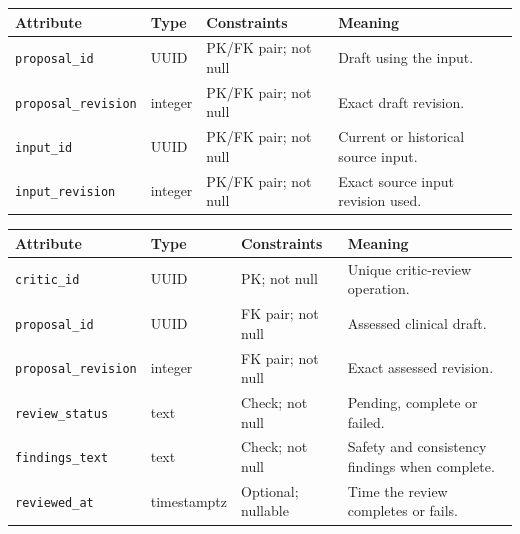 \begin{reporttable}
\setlength{\tabcolsep}{5pt}
\centering
\small
\caption{ProposalInput attributes, types and constraints.}
\label{tab:kashaf:dict-proposalinput}
\begin{tabular}{|p{}|p{}|p{}|p{}|}
\hline
Attribute & Type & Constraints & Meaning \\ \hline
\texttt{proposal\_id} & UUID & PK/FK pair; not null & Draft using the input. \\ \hline
\texttt{proposal\_revision} & integer & PK/FK pair; not null & Exact draft revision. \\ \hline
\texttt{input\_id} & UUID & PK/FK pair; not null & Current or historical source input. \\ \hline
\texttt{input\_revision} & integer & PK/FK pair; not null & Exact source input revision used. \\ \hline
\end{tabular}
\end{reporttable}

\begin{reporttable}
\setlength{\tabcolsep}{5pt}
\centering
\small
\caption{CriticReview attributes, types and constraints.}
\label{tab:kashaf:dict-criticreview}
\begin{tabular}{|p{}|p{}|p{}|p{}|}
\hline
Attribute & Type & Constraints & Meaning \\ \hline
\texttt{critic\_id} & UUID & PK; not null & Unique critic-review operation. \\ \hline
\texttt{proposal\_id} & UUID & FK pair; not null & Assessed clinical draft. \\ \hline
\texttt{proposal\_revision} & integer & FK pair; not null & Exact assessed revision. \\ \hline
\texttt{review\_status} & text & Check; not null & Pending, complete or failed. \\ \hline
\texttt{findings\_text} & text & Check; not null & Safety and consistency findings when complete. \\ \hline
\texttt{reviewed\_at} & timestamptz & Optional; nullable & Time the review completes or fails. \\ \hline
\end{tabular}
\end{reporttable}

